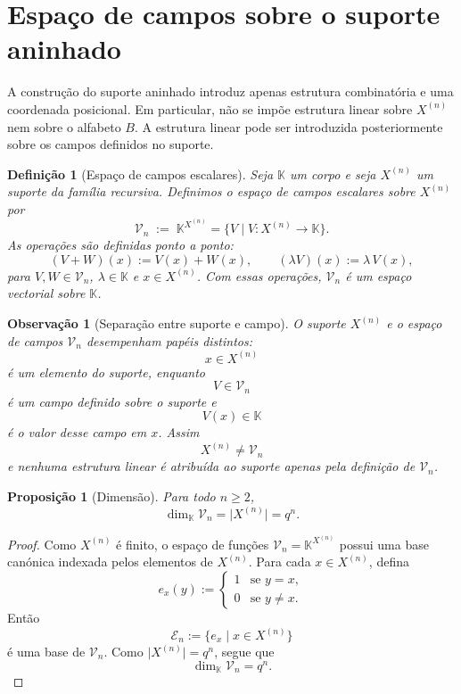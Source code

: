 \documentclass[11pt,a4paper]{article}
\newtheorem{definicao}{Definição}
\newtheorem{proposicao}{Proposição}
\newtheorem{observacao}{Observação}
\begin{document}
\section{Espaço de campos sobre o suporte aninhado}

A construção do suporte aninhado introduz apenas estrutura combinatória e uma coordenada posicional.
Em particular, não se impõe estrutura linear sobre \(X^{(n)}\) nem sobre o alfabeto \(B\).
A estrutura linear pode ser introduzida posteriormente sobre os campos definidos no suporte.

\begin{definicao}[Espaço de campos escalares]
\label{def:espaco-campos}
Seja \(\mathbb K\) um corpo e seja \(X^{(n)}\) um suporte da família recursiva.
Definimos o espaço de campos escalares sobre \(X^{(n)}\) por
\[
\mathcal V_n
\;:=\;
\mathbb K^{X^{(n)}}
=
\{V\mid V\colon X^{(n)}\to\mathbb K\}.
\]
As operações são definidas ponto a ponto:
\[
(V+W)(x)
:=
V(x)+W(x),
\qquad
(\lambda V)(x)
:=
\lambda\,V(x),
\]
para \(V,W\in\mathcal V_n\), \(\lambda\in\mathbb K\) e \(x\in X^{(n)}\).
Com essas operações, \(\mathcal V_n\) é um espaço vectorial sobre \(\mathbb K\).
\end{definicao}

\begin{observacao}[Separação entre suporte e campo]
\label{obs:suporte-campo}
O suporte \(X^{(n)}\) e o espaço de campos \(\mathcal V_n\) desempenham papéis distintos:
\[
x\in X^{(n)}
\]
é um elemento do suporte, enquanto
\[
V\in\mathcal V_n
\]
é um campo definido sobre o suporte e
\[
V(x)\in\mathbb K
\]
é o valor desse campo em \(x\).
Assim
\[
\boxed{X^{(n)}\neq\mathcal V_n}
\]
e nenhuma estrutura linear é atribuída ao suporte apenas pela definição de \(\mathcal V_n\).
\end{observacao}

\begin{proposicao}[Dimensão]
\label{prop:dimensao-campos}
Para todo \(n\ge 2\),
\[
\dim_{\mathbb K}\mathcal V_n
=
\lvert X^{(n)}\rvert
=
q^{n}.
\]
\end{proposicao}

\begin{proof}
Como \(X^{(n)}\) é finito, o espaço de funções \(\mathcal V_n=\mathbb K^{X^{(n)}}\) possui uma base canónica indexada pelos elementos de \(X^{(n)}\).
Para cada \(x\in X^{(n)}\), defina
\[
e_x(y)
:=
\begin{cases}
1 & \text{se }y=x,\\
0 & \text{se }y\neq x.
\end{cases}
\]
Então
\[
\mathcal E_n
:=
\{e_x\mid x\in X^{(n)}\}
\]
é uma base de \(\mathcal V_n\).
Como \(\lvert X^{(n)}\rvert=q^{n}\), segue que
\[
\dim_{\mathbb K}\mathcal V_n
=
q^{n}.
\]
\end{proof}
\end{document}
